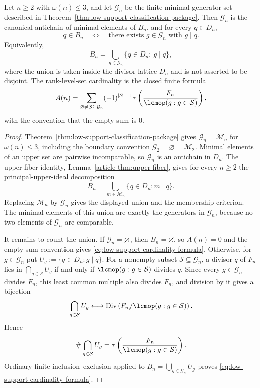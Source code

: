 \begin{corollary}
\label{cor:low-support-normal-form}
\label{cor:low-support-birth-layer-package}
\label{prop:low-support-cardinality-formula}
Let $n\ge2$ with $\omega(n)\le3$, and let $\mathcal G_n$ be the finite
minimal-generator set described in
Theorem~\ref{thm:low-support-classification-package}.  Then $\mathcal G_n$ is
the canonical antichain of minimal elements of $B_n$, and for every $q\in D_n$,
\[
q\in B_n\quad\Longleftrightarrow\quad
\text{there exists }g\in\mathcal G_n\text{ with }g\mid q.
\]
Equivalently,
\[
B_n=\bigcup_{g\in\mathcal G_n}\{q\in D_n:\ g\mid q\},
\]
where the union is taken inside the divisor lattice $D_n$ and is not asserted
to be disjoint.  The rank-level-set cardinality is the closed finite formula
\begin{equation}\label{eq:low-support-cardinality-formula}
A(n)=
\sum_{\varnothing\ne\mathcal S\subseteq\mathcal G_n}
(-1)^{|\mathcal S|+1}
\tau\left(\frac{F_n}{\lcmop(g:g\in\mathcal S)}\right),
\end{equation}
with the convention that the empty sum is $0$.
\end{corollary}

\begin{proof}
Theorem~\ref{thm:low-support-classification-package} gives
$\mathcal G_n=\mathcal M_n$ for $\omega(n)\le3$, including the boundary
convention $\mathcal G_2=\varnothing=\mathcal M_2$. Minimal elements of an
upper set are pairwise incomparable, so $\mathcal G_n$ is an antichain in
$D_n$.  The upper-fiber identity, Lemma~\ref{article-thm:upper-fiber}, gives for every
$n\ge2$ the principal-upper-ideal decomposition
\[
B_n=\bigcup_{m\in\mathcal M_n}\{q\in D_n:m\mid q\}.
\]
Replacing $\mathcal M_n$ by $\mathcal G_n$ gives the displayed union and the
membership criterion.  The minimal elements of this union are exactly the
generators in $\mathcal G_n$, because no two elements of $\mathcal G_n$ are
comparable.

It remains to count the union.  If $\mathcal G_n=\varnothing$, then
$B_n=\varnothing$, so $A(n)=0$ and the empty-sum convention gives
\eqref{eq:low-support-cardinality-formula}.  Otherwise, for $g\in\mathcal G_n$
put $U_g:=\{q\in D_n:g\mid q\}$.  For a nonempty subset
$\mathcal S\subseteq\mathcal G_n$, a divisor $q$ of $F_n$ lies in
$\bigcap_{g\in\mathcal S}U_g$ if and only if
$\lcmop(g:g\in\mathcal S)$ divides $q$.  Since every $g\in\mathcal G_n$ divides
$F_n$, this least common multiple also divides $F_n$, and division by it gives a
bijection
\[
\bigcap_{g\in\mathcal S}U_g
\longleftrightarrow
\operatorname{Div}\left(F_n/\lcmop(g:g\in\mathcal S)\right).
\]
Hence
\[
\#\bigcap_{g\in\mathcal S}U_g=
\tau\left(\frac{F_n}{\lcmop(g:g\in\mathcal S)}\right).
\]
Ordinary finite inclusion--exclusion applied to
$B_n=\bigcup_{g\in\mathcal G_n}U_g$ proves
\eqref{eq:low-support-cardinality-formula}.
\end{proof}

